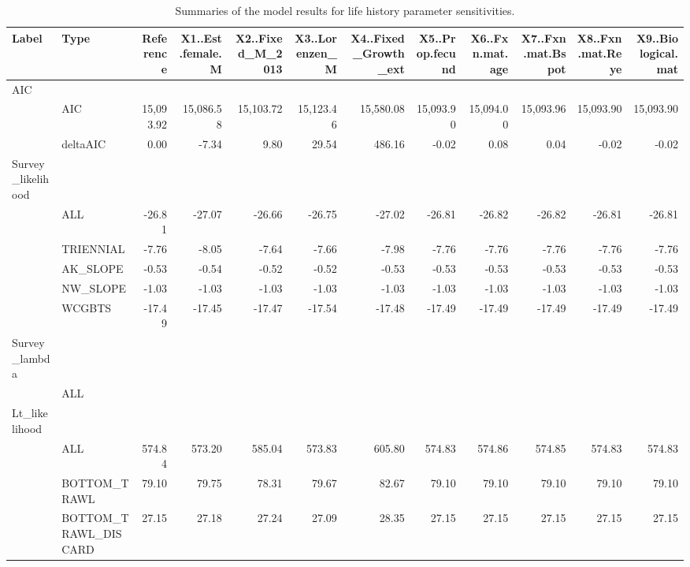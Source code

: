 \documentclass[
]{scrartcl}
\begin{document}
\newpage{}

\begin{landscape}
\begingroup
\fontsize{9.0pt}{10.8pt}\selectfont

\begin{longtable}{llrrrrrrrrrr}

\caption{\label{tbl-sensitivities-life-history}Summaries of the model
results for life history parameter sensitivities.}

\tabularnewline

\toprule
Label & Type & Reference & X1..Est.female.M & X2..Fixed\_M\_2013 & X3..Lorenzen\_M & X4..Fixed\_Growth\_ext & X5..Prop.fecund & X6..Fxn.mat.age & X7..Fxn.mat.Bspot & X8..Fxn.mat.Reye & X9..Biological.mat \\ 
\midrule\addlinespace[2.5pt]
AIC &  &  &  &  &  &  &  &  &  &  &  \\ 
 & AIC & 15,093.92 & 15,086.58 & 15,103.72 & 15,123.46 & 15,580.08 & 15,093.90 & 15,094.00 & 15,093.96 & 15,093.90 & 15,093.90 \\ 
 & deltaAIC & 0.00 & -7.34 & 9.80 & 29.54 & 486.16 & -0.02 & 0.08 & 0.04 & -0.02 & -0.02 \\ 
Survey\_likelihood &  &  &  &  &  &  &  &  &  &  &  \\ 
 & ALL & -26.81 & -27.07 & -26.66 & -26.75 & -27.02 & -26.81 & -26.82 & -26.82 & -26.81 & -26.81 \\ 
 & TRIENNIAL & -7.76 & -8.05 & -7.64 & -7.66 & -7.98 & -7.76 & -7.76 & -7.76 & -7.76 & -7.76 \\ 
 & AK\_SLOPE & -0.53 & -0.54 & -0.52 & -0.52 & -0.53 & -0.53 & -0.53 & -0.53 & -0.53 & -0.53 \\ 
 & NW\_SLOPE & -1.03 & -1.03 & -1.03 & -1.03 & -1.03 & -1.03 & -1.03 & -1.03 & -1.03 & -1.03 \\ 
 & WCGBTS & -17.49 & -17.45 & -17.47 & -17.54 & -17.48 & -17.49 & -17.49 & -17.49 & -17.49 & -17.49 \\ 
Survey\_lambda &  &  &  &  &  &  &  &  &  &  &  \\ 
 & ALL &  &  &  &  &  &  &  &  &  &  \\ 
Lt\_likelihood &  &  &  &  &  &  &  &  &  &  &  \\ 
 & ALL & 574.84 & 573.20 & 585.04 & 573.83 & 605.80 & 574.83 & 574.86 & 574.85 & 574.83 & 574.83 \\ 
 & BOTTOM\_TRAWL & 79.10 & 79.75 & 78.31 & 79.67 & 82.67 & 79.10 & 79.10 & 79.10 & 79.10 & 79.10 \\ 
 & BOTTOM\_TRAWL\_DISCARD & 27.15 & 27.18 & 27.24 & 27.09 & 28.35 & 27.15 & 27.15 & 27.15 & 27.15 & 27.15 \\ 

\end{longtable}
\end{landscape}
\end{document}
